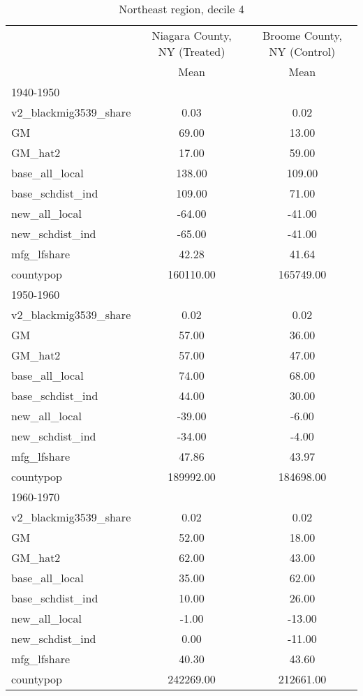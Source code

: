 \begin{table}[htbp]\centering
\def\sym#1{\ifmmode^{#1}\else\(^{#1}\)\fi}
\caption{Northeast region, decile 4 \label{tab1}}
\begin{tabular}{l*{2}{c}}
\toprule
                    &\multicolumn{1}{c}{Niagara County, NY (Treated)}&\multicolumn{1}{c}{Broome County, NY (Control)}\\
                    &        Mean&        Mean\\
\midrule
1940-1950           &            &            \\
v2\_blackmig3539\_share&        0.03&        0.02\\
GM                  &       69.00&       13.00\\
GM\_hat2             &       17.00&       59.00\\
base\_all\_local      &      138.00&      109.00\\
base\_schdist\_ind    &      109.00&       71.00\\
new\_all\_local       &      -64.00&      -41.00\\
new\_schdist\_ind     &      -65.00&      -41.00\\
mfg\_lfshare         &       42.28&       41.64\\
countypop           &   160110.00&   165749.00\\
\midrule
1950-1960           &            &            \\
v2\_blackmig3539\_share&        0.02&        0.02\\
GM                  &       57.00&       36.00\\
GM\_hat2             &       57.00&       47.00\\
base\_all\_local      &       74.00&       68.00\\
base\_schdist\_ind    &       44.00&       30.00\\
new\_all\_local       &      -39.00&       -6.00\\
new\_schdist\_ind     &      -34.00&       -4.00\\
mfg\_lfshare         &       47.86&       43.97\\
countypop           &   189992.00&   184698.00\\
\midrule
1960-1970           &            &            \\
v2\_blackmig3539\_share&        0.02&        0.02\\
GM                  &       52.00&       18.00\\
GM\_hat2             &       62.00&       43.00\\
base\_all\_local      &       35.00&       62.00\\
base\_schdist\_ind    &       10.00&       26.00\\
new\_all\_local       &       -1.00&      -13.00\\
new\_schdist\_ind     &        0.00&      -11.00\\
mfg\_lfshare         &       40.30&       43.60\\
countypop           &   242269.00&   212661.00\\
\bottomrule
\end{tabular}
\end{table}

